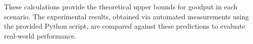         \vspace{0.1cm} %

        \noindent These calculations provide the theoretical upper bounds for goodput in each scenario. 
        The experimental results, obtained via automated measurements using the provided Python script, are compared against these predictions to evaluate real-world performance.

        \medskip